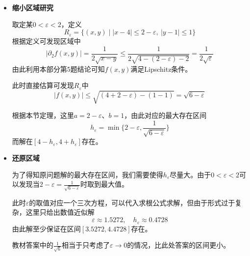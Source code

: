 \documentclass[a4paper,UTF8,fontset=windows,AutoFakeBold]{ctexart}
\newcommand*{\note}{\noindent *}
\theoremstyle{ex}
\begin{document}
\begin{enumerate}
{\begin{itemize}
            由于条件的区域为$|x-4|\le2$、$|y-1|\le1$，可发现$x\ge y$恒成立，从而可去除绝对值。设
            $$f(x,y)=\sqrt{x-y}$$
            直接计算可知
            $$\partial_2f(x,y)=-\frac{1}{2\sqrt{x-y}}$$
            若$\partial_2f(x,y)$有界，利用本部分第5题结论可知其对$y$满足Lipschitz条件，但在$x\to2^+$、$y\to2^-$时，$\partial_2f(x,y)$将趋于无穷，不满足。

            不过，只要略微缩小区间，给定$\varepsilon>0$，考虑新区域
            $$R_\varepsilon=\{(x,y)\mid |x-4|\le 2-\varepsilon,\ |y-1|\le1\}$$
            这之中有$x-y\ge\varepsilon$，从而
            $$|\partial_2f(x,y)|\le\frac{1}{2\sqrt\varepsilon}$$
            有界。由此，我们先尝试在$R_\varepsilon$中进行研究。

            \item \textbf{缩小区域研究}
            
            取定某$0<\varepsilon<2$，定义
            $$R_\varepsilon=\{(x,y)\mid |x-4|\le 2-\varepsilon,\ |y-1|\le1\}$$
            根据定义可发现区域中
            $$|\partial_2f(x,y)|=\frac{1}{2\sqrt{x-y}}\le\frac{1}{2\sqrt{4-(2-\varepsilon)-2}}=\frac{1}{2\sqrt\varepsilon}$$
            由此利用本部分第5题结论可知$f(x,y)$满足Lipschitz条件。

            此时直接估算可发现$R_\varepsilon$中
            $$|f(x,y)|\le\sqrt{(4+2-\varepsilon)-(1-1)}=\sqrt{6-\varepsilon}$$

            根据本节定理，这里$a=2-\varepsilon$、$b=1$，由此对应的最大存在区间
            $$h_\varepsilon=\min\bigg\{2-\varepsilon,\frac{1}{\sqrt{6-\varepsilon}}\bigg\}$$
            而解在$[4-h_\varepsilon,4+h_\varepsilon]$存在。

            \item \textbf{还原区域}
            
            为了得知原问题解的最大存在区间，我们需要使得$h_\varepsilon$尽量大。由于$0<\varepsilon<2$可以发现当$2-\varepsilon=\frac{1}{\sqrt{6-\varepsilon}}$时取到最大值。

            此时$\varepsilon$的取值对应一个三次方程，可以代入求根公式求解，但由于形式过于复杂，这里只给出数值近似解
            $$\varepsilon\approx1.5272,\quad h_\varepsilon\approx0.4728$$
            由此解至少保证在区间$[3.5272,4.4728]$存在。

            \note 教材答案中的$\frac{1}{\sqrt6}$相当于只考虑了$\varepsilon\to0$的情况，比此处答案的区间更小。
        \end{itemize}
        
    }


\end{enumerate}
\end{document}
